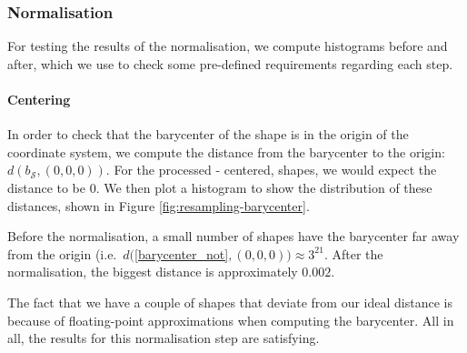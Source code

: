 \subsubsection{Normalisation}
For testing the results of the normalisation, we compute histograms before and after, which we use to check some
pre-defined requirements regarding each step.

\paragraph{Centering}
In order to check that the barycenter of the shape is in the origin of the coordinate system, we compute the distance from the barycenter to the origin: $d(b_{\mathcal{S}}, (0,0,0))$.
For the processed - centered, shapes, we would expect the distance to be $0$.
We then plot a histogram to show the distribution of these distances, shown in Figure \ref{fig:resampling-barycenter}.

Before the normalisation, a small number of shapes have the barycenter far away from the origin (i.e.\ $d
($\ref{barycenter_not}$, (0,0,0)) \approx 3^{21}$.
After the normalisation, the biggest distance is approximately $0.002$.

The fact that we have a couple of shapes that deviate from our ideal distance is because of floating-point
approximations when computing the barycenter.
All in all, the results for this normalisation step are satisfying.

